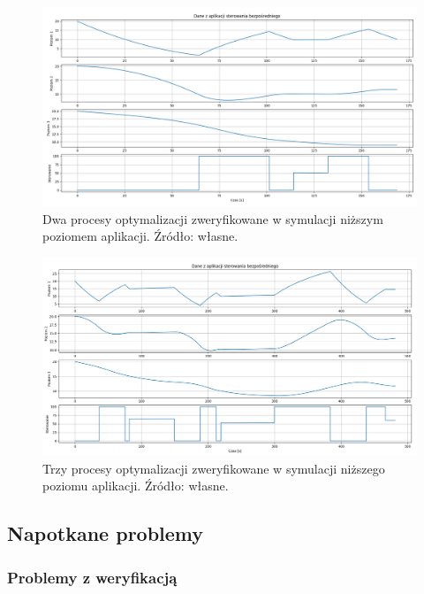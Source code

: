 
\begin{figure}
    \centering
    \includegraphics[scale=0.5,angle=90]{Grafika/ext_ctrl_2_opts}
    \caption{Dwa procesy optymalizacji zweryfikowane w symulacji niższym poziomem aplikacji. Źródło: własne.}
    \label{fig:extctrl2opts}
\end{figure}

\begin{figure}
    \centering
    \includegraphics[scale=0.5,angle=90]{Grafika/ext_ctrl_3_opts}
    \caption{Trzy procesy optymalizacji zweryfikowane w symulacji niższego poziomu aplikacji. Źródło: własne.}
    \label{fig:extctrl3opts}
\end{figure}

\subsection{Napotkane problemy}
\label{sub:sym-problems}

\subsubsection{Problemy z weryfikacją}

